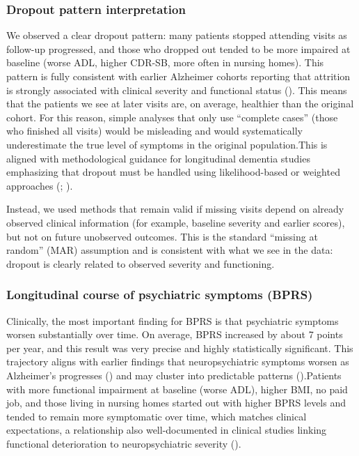 \documentclass[
  9pt,
  letterpaper,
  DIV=11,
  numbers=noendperiod]{scrartcl}
\begin{document}
\subsubsection{Dropout pattern
interpretation}\label{dropout-pattern-interpretation}

We observed a clear dropout pattern: many patients stopped attending
visits as follow-up progressed, and those who dropped out tended to be
more impaired at baseline (worse ADL, higher CDR-SB, more often in
nursing homes). This pattern is fully consistent with earlier Alzheimer
cohorts reporting that attrition is strongly associated with clinical
severity and functional status
(). This means that the patients we see at later visits are, on
average, healthier than the original cohort. For this reason, simple
analyses that only use ``complete cases'' (those who finished all
visits) would be misleading and would systematically underestimate the
true level of symptoms in the original population.This is aligned with
methodological guidance for longitudinal dementia studies emphasizing
that dropout must be handled using likelihood-based or weighted
approaches (; ).

Instead, we used methods that remain valid if missing visits depend on
already observed clinical information (for example, baseline severity
and earlier scores), but not on future unobserved outcomes. This is the
standard ``missing at random'' (MAR) assumption and is consistent with
what we see in the data: dropout is clearly related to observed severity
and functioning.

\subsubsection{Longitudinal course of psychiatric symptoms
(BPRS)}\label{longitudinal-course-of-psychiatric-symptoms-bprs}

Clinically, the most important finding for BPRS is that psychiatric
symptoms worsen substantially over time. On average, BPRS increased by
about 7 points per year, and this result was very precise and highly
statistically significant. This trajectory aligns with earlier findings
that neuropsychiatric symptoms worsen as Alzheimer's progresses
() and may
cluster into predictable patterns
().Patients with more functional impairment at baseline (worse ADL),
higher BMI, no paid job, and those living in nursing homes started out
with higher BPRS levels and tended to remain more symptomatic over time,
which matches clinical expectations, a relationship also well-documented
in clinical studies linking functional deterioration to neuropsychiatric
severity ().
\end{document}
